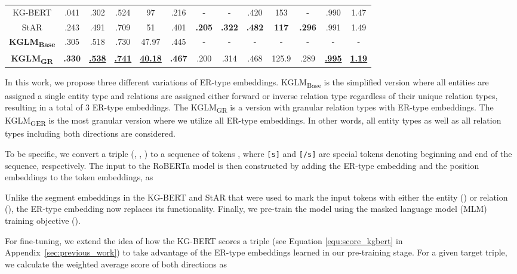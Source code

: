 \documentclass[11pt]{article}
\begin{document}
\begin{table*}[ht]
\begin{tabular}{ccccccccccccc}
    \midrule
    KG-BERT & .041 & .302 & .524 & 97 & .216 & - & - & .420 & 153 & - & .990 & 1.47 \\
    StAR & .243 & .491 & .709 & 51 & .401 & \textbf{.205} & \textbf{.322} & \textbf{.482} & \textbf{117} & \textbf{.296} & .991 & 1.49 \\
    \midrule
    \textbf{KGLM\textsubscript{Base}} & .305 & .518 & .730 & 47.97 & .445 & - & - & - & - & - & - & - \\
    \textbf{KGLM\textsubscript{GR}} & \textbf{.330} & \underline{\textbf{.538}} & \underline{\textbf{.741}} & \underline{\textbf{40.18}} & \textbf{.467} & .200 & .314 & .468 & 125.9 & .289 & \underline{\textbf{.995}} & \underline{\textbf{1.19}} \\
    \bottomrule
\end{tabular}
\label{tab:link_prediction_results}
\end{table*}


In this work, we propose three different variations of ER-type embeddings. KGLM\textsubscript{Base} is the simplified version where all entities are assigned a single entity type and relations are assigned either forward or inverse relation type regardless of their unique relation types, resulting in a total of 3 ER-type embeddings. The KGLM\textsubscript{GR} is a version with granular relation types with  ER-type embeddings. The KGLM\textsubscript{GER} is the most granular version where we utilize all  ER-type embeddings. In other words, all entity types as well as all relation types including both directions are considered.

To be specific, we convert a triple (, , ) to a sequence of tokens , where \texttt{[s]} and \texttt{[/s]} are special tokens denoting beginning and end of the sequence, respectively. The input to the RoBERTa model is then constructed by adding the ER-type embedding  and the  position embeddings to the  token embeddings, as

Unlike the segment embeddings in the KG-BERT and StAR that were used to mark the input tokens with either the entity () or relation (), the ER-type embedding now replaces its functionality. Finally, we pre-train the model using the masked language model (MLM) training objective (\citealp{liu2019roberta}).

For fine-tuning, we extend the idea of how the KG-BERT scores a triple (see Equation \ref{equ:score_kgbert} in Appendix~\ref{sec:previous_work}) to take advantage of the ER-type embeddings learned in our pre-training stage. For a given target triple, we calculate the weighted average score of both directions as
\end{document}
